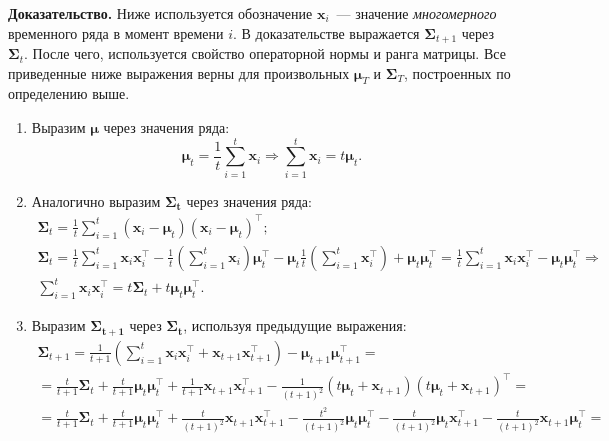 \documentclass{article}
\begin{document}
\textbf{Доказательство.}
Ниже используется обозначение $\mathbf{x}_i$~--- значение \textit{многомерного} временного ряда в момент времени $i$. В доказательстве выражается $\mathbf{\Sigma}_{t+1}$ через $\mathbf{\Sigma}_t$. После чего, используется свойство операторной нормы и ранга матрицы. Все приведенные ниже выражения верны для произвольных $\boldsymbol{\mu}_T$ и $\mathbf{\Sigma}_T$, построенных по определению выше.
\begin{enumerate}
	\item Выразим $\boldsymbol{\mu}$ через значения ряда: \[\boldsymbol{\mu}_t = \frac{1}{t} \sum_{i=1}^{t} \mathbf{x}_i \Rightarrow \sum_{i=1}^{t} \mathbf{x}_i = t \boldsymbol{\mu}_t.\]
	\item Аналогично выразим $\mathbf{\Sigma_t}$ через значения ряда:
		\begin{gather*}
		\mathbf{\Sigma}_t = \frac{1}{t} \sum_{i=1}^{t} (\mathbf{x}_i-\boldsymbol{\mu}_t)(\mathbf{x}_i-\boldsymbol{\mu}_t)^\intercal;\\
		\mathbf{\Sigma}_t = \frac{1}{t} \sum_{i=1}^{t} \mathbf{x}_i \mathbf{x}_i^\intercal - \frac{1}{t} \left( \sum_{i=1}^{t} \mathbf{x}_i\right) \boldsymbol{\mu}_t^\intercal - \boldsymbol{\mu}_t \frac{1}{t} \left( \sum_{i=1}^{t} \mathbf{x}_i^\intercal\right) + \boldsymbol{\mu}_t \boldsymbol{\mu}_t^\intercal = \frac{1}{t} \sum_{i=1}^{t} \mathbf{x}_i \mathbf{x}_i^\intercal - \boldsymbol{\mu}_t \boldsymbol{\mu}_t^\intercal \Rightarrow\\
		\sum_{i=1}^{t} \mathbf{x}_i \mathbf{x}_i^\intercal = t \mathbf{\Sigma}_t + t \boldsymbol{\mu}_t \boldsymbol{\mu}_t^\intercal.
		\end{gather*}
	\item Выразим $\mathbf{\Sigma_{t+1}}$ через $\mathbf{\Sigma_t}$, используя предыдущие выражения:
	\begin{gather*}
		\mathbf{\Sigma}_{t+1} = \frac{1}{t+1} \left(\sum_{i=1}^{t} \mathbf{x}_i \mathbf{x}_i^\intercal + \mathbf{x}_{t+1} \mathbf{x}_{t+1}^\intercal \right) - \boldsymbol{\mu}_{t+1} \boldsymbol{\mu}_{t+1}^\intercal = \\
		= \frac{t}{t+1}\mathbf{\Sigma}_t + \frac{t}{t+1}\boldsymbol{\mu}_{t} \boldsymbol{\mu}_{t}^\intercal + \frac{1}{t+1} \mathbf{x}_{t+1} \mathbf{x}_{t+1}^\intercal - \frac{1}{(t+1)^2} (t \boldsymbol{\mu}_t + \mathbf{x}_{t+1})(t \boldsymbol{\mu}_t + \mathbf{x}_{t+1})^\intercal =\\
		= \frac{t}{t+1}\mathbf{\Sigma}_t + \frac{t}{t+1}\boldsymbol{\mu}_{t} \boldsymbol{\mu}_{t}^\intercal + \frac{t}{(t+1)^2} \mathbf{x}_{t+1} \mathbf{x}_{t+1}^\intercal - \frac{t^2}{(t+1)^2}\boldsymbol{\mu}_{t} \boldsymbol{\mu}_{t}^\intercal - \frac{t}{(t+1)^2}\boldsymbol{\mu}_{t} \mathbf{x}_{t+1}^\intercal - \frac{t}{(t+1)^2}\mathbf{x}_{t+1} \boldsymbol{\mu}_{t}^\intercal =\\

\end{gather*}
\end{enumerate}
\end{document}

